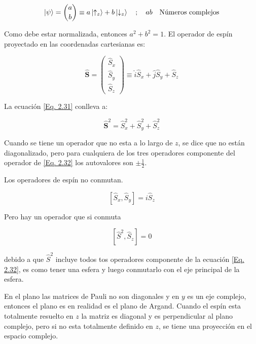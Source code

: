 \documentclass[11pt,fleqn]{book}
\renewcommand{\vec}[1]{\mathbf{#1}}
\begin{document}
\begin{equation*}
    \ket{\psi}=\binom{a}{b}\equiv a\ket{\uparrow_{z}}+b\ket{\downarrow_{z}}\quad;\quad ab\quad\text{Números complejos}
\end{equation*}

Como debe estar normalizada, entonces $a^{2}+b^{2}=1$. El operador de espín proyectado en las coordenadas cartesianas es:

\begin{equation}
    \hat{\vec{S}}=\begin{pmatrix}
                    \hat{S}_{x}\\
                    \hat{S}_{y}\\
                    \hat{S}_{z}
                \end{pmatrix}\equiv\hat{i}\hat{S}_{x}+\hat{j}\hat{S}_{y}+\hat{S}_{z}
    \label{Eq. 2.31}
\end{equation}

La ecuación \ref{Eq. 2.31} conlleva a:

\begin{equation}
    \hat{\vec{S}}^{2}=\hat{S}_{x}^{2}+\hat{S}_{y}^{2}+\hat{S}_{z}^{2}
    \label{Eq. 2.32}
\end{equation}

Cuando se tiene un operador que no esta a lo largo de $z$, se dice que no están diagonalizado, pero para cualquiera de los tres operadores componente del operador de \ref{Eq. 2.32} los autovalores son $\pm\frac{1}{2}$.

\begin{example} Los operadores de espín no conmutan. 

\begin{equation*}
    \left[\hat{S}_{x},\hat{S}_{y}\right]=i\hat{S}_{z}
\end{equation*}

Pero hay un operador que si conmuta

\begin{equation*}
    \left[\hat{S}^{2},\hat{S}_{z}\right]=0
\end{equation*}

debido a que $\hat{S}^{2}$ incluye todos tos operadores componente de la ecuación \ref{Eq. 2.32}, es como tener una esfera y luego conmutarlo con el eje principal de la esfera.

\end{example}

En el plano las matrices de Pauli no son diagonales y en $y$ es un eje complejo, entonces el plano es en realidad es el plano de Argand. Cuando el espín esta totalmente resuelto en $z$ la matriz es diagonal y es perpendicular al plano complejo, pero si no esta totalmente definido en $z$, se tiene una proyección en el espacio complejo.
\end{document}
